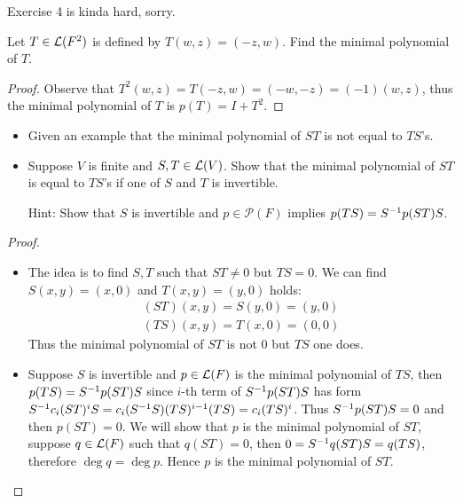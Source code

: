\documentclass[../main.tex]{subfiles}
\begin{document}
Exercise 4 is kinda hard, sorry.

\setcounter{exercise}{5}
\begin{exercise}
  Let $T \in \mathcal{L}(F^2)$ is defined by $T(w, z) = (-z, w)$.
  Find the minimal polynomial of $T$.
\end{exercise}
\begin{proof}
  Observe that $T^2(w, z) = T(-z, w) = (-w, -z) = (-1) (w, z)$,
  thus the minimal polynomial of $T$ is $p(T) = I + T^2$.
\end{proof}

\begin{exercise}
  \begin{itemize}
    \item Given an example that the minimal polynomial of $ST$ is not equal to $TS$'s.
    \item Suppose $V$ is finite and $S, T \in \mathcal{L}(V)$. Show that the minimal polynomial of $ST$
          is equal to $TS$'s if one of $S$ and $T$ is invertible.

          Hint: Show that $S$ is invertible and $p \in \mathcal{P}(F)$ implies $p(TS) = S^{-1} p(ST) S$.
  \end{itemize}
\end{exercise}
\begin{proof}
  ~
  \begin{itemize}
    \item The idea is to find $S, T$ such that $ST \neq 0$ but $TS = 0$. 
          We can find $S(x, y) = (x, 0)$ and $T(x, y) = (y, 0)$ holds:
          \begin{align*}
            (ST)(x, y) = S(y, 0) = (y, 0) \\
            (TS)(x, y) = T(x, 0) = (0, 0)
          \end{align*}
          Thus the minimal polynomial of $ST$ is not $0$ but $TS$ one does.
    \item Suppose $S$ is invertible and $p \in \mathcal{L}(F)$ is the minimal polynomial of $TS$,
          then $p(TS) = S^{-1} p(ST) S$ since $i$-th term of $S^{-1} p(ST) S$
          has form $S^{-1} c_i (ST)^i S = c_i (S^{-1} S)(TS)^{i - 1}(TS) = c_i (TS)^i$.
          Thus $S^{-1} p(ST) S = 0$ and then $p(ST) = 0$.
          We will show that $p$ is the minimal polynomial of $ST$, suppose $q \in \mathcal{L}(F)$
          such that $q(ST) = 0$, then $0 = S^{-1} q(ST) S = q(TS)$, therefore $\deg q = \deg p$.
          Hence $p$ is the minimal polynomial of $ST$.
  \end{itemize}
\end{proof}
\end{document}
